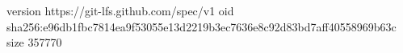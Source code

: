 version https://git-lfs.github.com/spec/v1
oid sha256:e96db1fbc7814ea9f53055e13d2219b3ec7636e8c92d83bd7aff40558969b63c
size 357770
